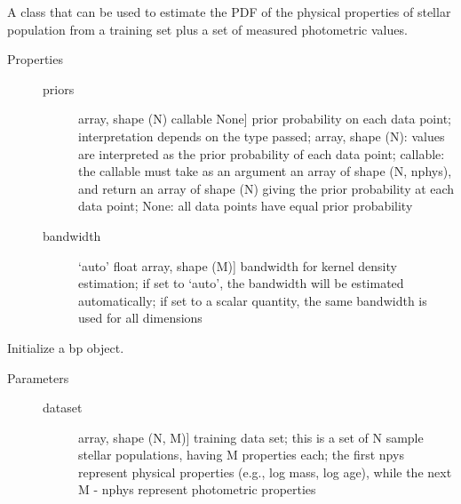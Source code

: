 \documentclass[letterpaper,10pt,english]{sphinxmanual}
\begin{document}
\begin{fulllineitems}
\label{bayesphot:slugpy.bayesphot.bp.bp}
A class that can be used to estimate the PDF of the physical
properties of stellar population from a training set plus a set of
measured photometric values.
\begin{description}
\item[{Properties}] \leavevmode\begin{description}
\item[{priors}] \leavevmode{[}array, shape (N) \textbar{} callable \textbar{} None{]}
prior probability on each data point; interpretation
depends on the type passed; array, shape (N): values are
interpreted as the prior probability of each data point;
callable: the callable must take as an argument an array
of shape (N, nphys), and return an array of shape (N)
giving the prior probability at each data point; None:
all data points have equal prior probability

\item[{bandwidth}] \leavevmode{[}`auto' \textbar{} float \textbar{} array, shape (M){]}
bandwidth for kernel density estimation; if set to
`auto', the bandwidth will be estimated automatically; if
set to a scalar quantity, the same bandwidth is used for all
dimensions

\end{description}

\end{description}

\begin{fulllineitems}
\label{bayesphot:slugpy.bayesphot.bp.bp.__init__}
Initialize a bp object.
\begin{description}
\item[{Parameters}] \leavevmode\begin{description}
\item[{dataset}] \leavevmode{[}array, shape (N, M){]}
training data set; this is a set of N sample stellar
populations, having M properties each; the first npys
represent physical properties (e.g., log mass, log age),
while the next M - nphys represent photometric
properties


\end{description}
\end{description}
\end{fulllineitems}
\end{fulllineitems}
\end{document}
